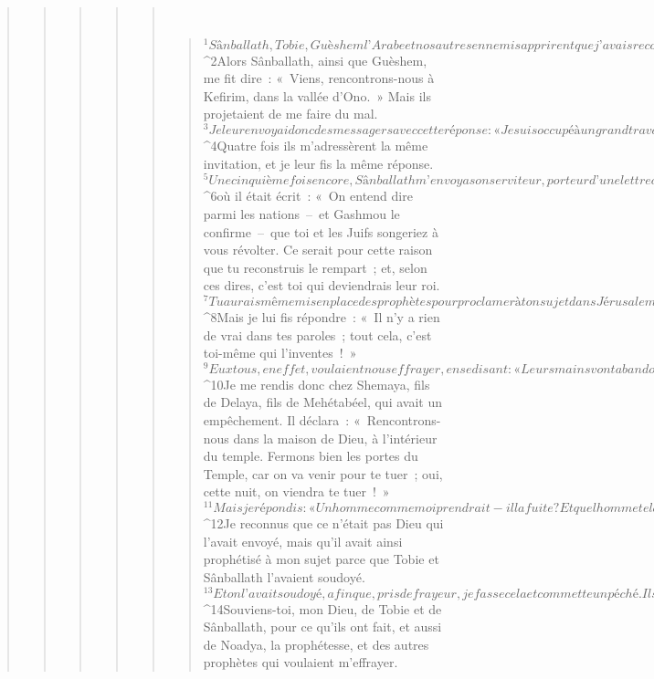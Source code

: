 \begin{verse}
\begin{verse}
\begin{verse}
\begin{verse}
\begin{verse}
         
      \bchapter{}
      \begin{verse}
${}^{1}Sânballath, Tobie, Guèshem l’Arabe et nos autres ennemis apprirent que j’avais reconstruit le rempart et qu’il n’y restait plus une seule brèche – à cette date toutefois, je n’avais pas encore posé les battants des portes. 
${}^{2}Alors Sânballath, ainsi que Guèshem, me fit dire : « Viens, rencontrons-nous à Kefirim, dans la vallée d’Ono. » Mais ils projetaient de me faire du mal. 
${}^{3}Je leur envoyai donc des messagers avec cette réponse : « Je suis occupé à un grand travail et je ne puis descendre : pourquoi le travail cesserait-il ? Devrais-je le quitter pour descendre vers vous ? » 
${}^{4}Quatre fois ils m’adressèrent la même invitation, et je leur fis la même réponse.
${}^{5}Une cinquième fois encore, Sânballath m’envoya son serviteur, porteur d’une lettre ouverte, 
${}^{6}où il était écrit : « On entend dire parmi les nations – et Gashmou le confirme – que toi et les Juifs songeriez à vous révolter. Ce serait pour cette raison que tu reconstruis le rempart ; et, selon ces dires, c’est toi qui deviendrais leur roi. 
${}^{7}Tu aurais même mis en place des prophètes pour proclamer à ton sujet dans Jérusalem : “Il y a un roi en Juda !” Et maintenant ces bruits-là vont parvenir aux oreilles du roi. Viens donc à présent, que nous tenions conseil ensemble. » 
${}^{8}Mais je lui fis répondre : « Il n’y a rien de vrai dans tes paroles ; tout cela, c’est toi-même qui l’inventes ! » 
${}^{9}Eux tous, en effet, voulaient nous effrayer, en se disant : « Leurs mains vont abandonner l’ouvrage, il ne se fera jamais. » Et maintenant, mon Dieu, fortifie mes mains ! 
${}^{10}Je me rendis donc chez Shemaya, fils de Delaya, fils de Mehétabéel, qui avait un empêchement. Il déclara : « Rencontrons-nous dans la maison de Dieu, à l’intérieur du temple. Fermons bien les portes du Temple, car on va venir pour te tuer ; oui, cette nuit, on viendra te tuer ! » 
${}^{11}Mais je répondis : « Un homme comme moi prendrait-il la fuite ? Et quel homme tel que moi pourrait entrer dans le Temple et rester en vie ? Non, je n’y entrerai pas ! » 
${}^{12}Je reconnus que ce n’était pas Dieu qui l’avait envoyé, mais qu’il avait ainsi prophétisé à mon sujet parce que Tobie et Sânballath l’avaient soudoyé. 
${}^{13}Et on l’avait soudoyé, afin que, pris de frayeur, je fasse cela et commette un péché. Ils en auraient eu prétexte à me faire mauvaise réputation. Ainsi auraient-ils pu m’outrager !
${}^{14}Souviens-toi, mon Dieu, de Tobie et de Sânballath, pour ce qu’ils ont fait, et aussi de Noadya, la prophétesse, et des autres prophètes qui voulaient m’effrayer.

\end{verse}
\end{verse}
\end{verse}
\end{verse}
\end{verse}
\end{verse}
